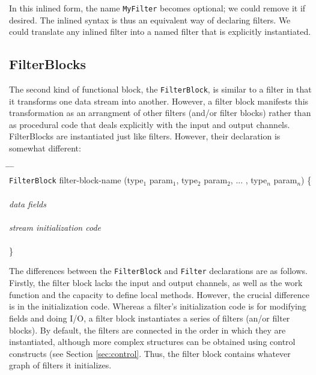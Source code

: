 \documentclass[draft]{article}
\begin{document}
In this inlined form, the name {\tt MyFilter} becomes optional; we
could remove it if desired.  The inlined syntax is thus an equivalent
way of declaring filters.  We could translate any inlined filter into
a named filter that is explicitly instantiated.

\subsection{FilterBlocks}

The second kind of functional block, the {\tt FilterBlock}, is similar
to a filter in that it transforms one data stream into another.
However, a filter block manifests this transformation as an arrangment
of other filters (and/or filter blocks) rather than as procedural code
that deals explicitly with the input and output channels.
FilterBlocks are instantiated just like filters.  However, their
declaration is somewhat different:

\begin{tabbing}
\hspace{0.2in} \= \hspace{0.2in} \= \hspace{0.2in} \= \hspace{0.2in} \= \\

{\tt FilterBlock} filter-block-name (type$_1$ param$_1$, type$_2$ param$_2$,
... , type$_n$ param$_n$) \{ \\ \\

\> {\it data fields} \\ \\

\> {\it stream initialization code} \\ \\

\}
\end{tabbing}

The differences between the {\tt FilterBlock} and {\tt Filter}
declarations are as follows.  Firstly, the filter block lacks the
input and output channels, as well as the work function and the
capacity to define local methods.  However, the crucial difference is
in the initialization code.  Whereas a filter's initialization code is
for modifying fields and doing I/O, a filter block instantiates a
series of filters (an/or filter blocks).  By default, the filters are
connected in the order in which they are instantiated, although more
complex structures can be obtained using control constructs (see
Section {\ref{sec:control}}.  Thus, the filter block contains whatever
graph of filters it initializes.  
\end{document}

